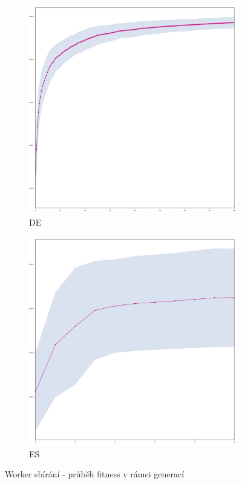 	\begin{figure}[p]
		\centering
		\begin{subfigure}{.5\textwidth}
			\centering
			\includegraphics[width=\linewidth]{../img/WoodMap/DE/graph_of_WorkerPickUpMem-mean.png}
			\caption{DE}
			\label{obr04:PickupDE}
		\end{subfigure}%
		\begin{subfigure}{.5\textwidth}
			\centering
			\includegraphics[width=\linewidth]{../img/WoodMap/ES/WoodPickupES-mean.png}
			\caption{ES}
			\label{obr04:PickupES}
		\end{subfigure}
		\caption{Worker sbírání - průběh fitness v rámci generací}
		\label{obr04:Pickup}
	\end{figure}
	\clearpage
